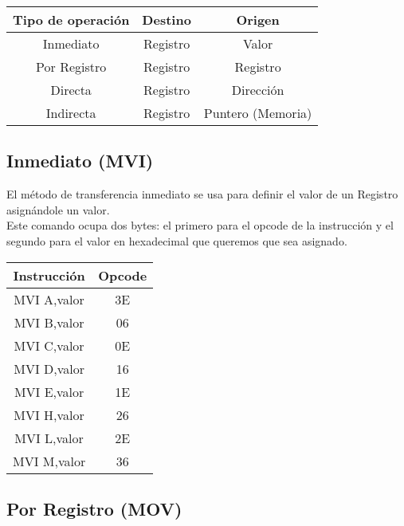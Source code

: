 \documentclass[12pt]{article}
\begin{document}
		\begin{table}[H]
		
			\centering
		
			\begin{tabular}{c|cc}
				\toprule
				Tipo de operación & Destino & Origen     \\
				\midrule
				Inmediato & Registro & Valor             \\
				Por Registro & Registro & Registro       \\
				Directa & Registro & Dirección           \\
				Indirecta & Registro & Puntero (Memoria) \\			
				\bottomrule
			\end{tabular}
		
		\end{table}
	
		\subsection{Inmediato (MVI)}
	
			El método de transferencia inmediato se usa para definir el valor de un Registro asignándole un valor.\\
	
			Este comando ocupa dos bytes: el primero para el opcode de la instrucción y el segundo para el valor en hexadecimal que queremos que sea asignado.\\
	
			\begin{table}[H]
				\centering
				\begin{tabular}{c|c}
					Instrucción & Opcode \\
					\midrule
					MVI A,valor & 3E \\
					MVI B,valor & 06 \\
					MVI C,valor & 0E \\
					MVI D,valor & 16 \\
					MVI E,valor & 1E \\
					MVI H,valor & 26 \\
					MVI L,valor & 2E \\
					MVI M,valor & 36 \\
				\end{tabular}
			\end{table}
	
		\subsection{Por Registro (MOV)}
	
\end{document}
